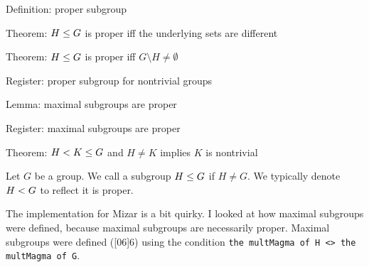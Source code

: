 \nwenddocs{}\endmoddef\nwstartdeflinemarkup{}\nwenddeflinemarkup
\LA{}Definition: proper subgroup~{\nwtagstyle{}}\RA{}

\LA{}Theorem: $H\leq G$ is proper iff the underlying sets are different~{\nwtagstyle{}}\RA{}

\LA{}Theorem: $H\leq G$ is proper iff $G\setminus H\neq\emptyset$~{\nwtagstyle{}}\RA{}

\LA{}Register: proper subgroup for nontrivial groups~{\nwtagstyle{}}\RA{}

\LA{}Lemma: maximal subgroups are proper~{\nwtagstyle{}}\RA{}

\LA{}Register: maximal subgroups are proper~{\nwtagstyle{}}\RA{}

\LA{}Theorem: $H< K\leq G$ and $H\neq K$ implies $K$ is nontrivial~{\nwtagstyle{}}\RA{}
\nwendcode{}\nwdocspar

\begin{definition}
Let $G$ be a group. We call a subgroup $H\leq G$  if
$H\neq G$. We typically denote $H< G$ to reflect it is proper.
\end{definition}

\begin{def-remark}
The implementation for Mizar is a bit quirky. I looked at how maximal
subgroups were defined, because maximal subgroups are necessarily
proper. Maximal subgroups were defined ([06]{6})
using the condition \lstinline|the multMagma of H <> the multMagma of G|.
\end{def-remark}

